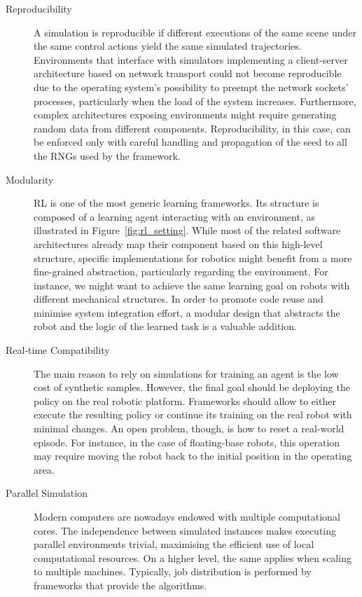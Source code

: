 \begin{description}
%
\item[Reproducibility]
%
A simulation is reproducible if different executions of the same scene under the same control actions yield the same simulated trajectories.
Environments that interface with simulators implementing a client-server architecture based on network transport could not become reproducible due to the operating system's possibility to preempt the network sockets' processes, particularly when the load of the system increases.
Furthermore, complex architectures exposing environments might require generating random data from different components.
Reproducibility, in this case, can be enforced only with careful handling and propagation of the seed to all the \acp{RNG} used by the framework.
%
\item[Modularity]
%
\acl{RL} is one of the most generic learning frameworks.
Its structure is composed of a learning agent interacting with an environment, as illustrated in Figure~\ref{fig:rl_setting}.
While most of the related software architectures already map their component based on this high-level structure, specific implementations for robotics might benefit from a more fine-grained abstraction, particularly regarding the environment.
For instance, we might want to achieve the same learning goal on robots with different mechanical structures.
In order to promote code reuse and minimise system integration effort, a modular design that abstracts the robot and the logic of the learned task is a valuable addition.
%
\item[Real-time Compatibility]
%
The main reason to rely on simulations for training an agent is the low cost of synthetic samples.
However, the final goal should be deploying the policy on the real robotic platform.
Frameworks should allow to either execute the resulting policy or continue its training on the real robot with minimal changes.
An open problem, though, is how to reset a real-world episode.
For instance, in the case of floating-base robots, this operation may require moving the robot back to the initial position in the operating area.
%
\item[Parallel Simulation]
%
Modern computers are nowadays endowed with multiple computational cores.
The independence between simulated instances makes executing parallel environments trivial,
maximising the efficient use of local computational resources.
On a higher level, the same applies when scaling to multiple machines.
Typically, job distribution is performed by frameworks that provide the algorithms.

\end{description}
